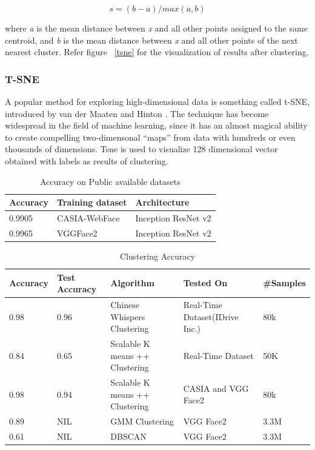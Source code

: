 \documentclass[a4paper,12pt, twoside]{NITKReport}
\begin{document}
\begin{equation}
s = (b-a)/max(a,b)
\end{equation}

\par where \textit{a} is the mean distance between \textit{x} and all other points
assigned to the same centroid, and \textit{b} is the mean distance between \textit{x} and all other points of the next nearest cluster. Refer figure ~\ref{tsne} for the visualization of results after clustering.

\subsubsection{T-SNE}
A popular method for exploring high-dimensional data is something called t-SNE, introduced by van der Maaten and Hinton \cite{maaten2008visualizing} . The technique has become widespread in the field of machine learning, since it has an almost magical ability to create compelling two-dimensonal “maps” from data with hundreds or even thousands of dimensions. Tsne is used to visualize 128 dimensional vector obtained with labels as results of clustering.

\begin{table}[h]
  \centering
\begin{tabular}{ |p{4cm}|p{4cm}|p{4cm}|}
\hline
Accuracy & Training dataset & Architecture\\
\hline
0.9905 & CASIA-WebFace & Inception ResNet v2 \\
\hline
0.9965 & VGGFace2 &	Inception ResNet v2 \\
\hline
\end{tabular}
\caption{Accuracy on Public available datasets}\label{table:acc_}
\end{table}


\begin{table}[h]
  \centering
\begin{tabular}{ |p{1.5cm}|p{1.5cm}|p{3.5cm}|p{4cm}|p{2cm}|}
\hline
Accuracy & Test Accuracy & Algorithm & Tested On & \#Samples\\
\hline
0.98 & 0.96 & Chinese Whispers Clustering & Real-Time Dataset(IDrive Inc.) & 80k \\
\hline
0.84 & 0.65 & Scalable K means ++ Clustering & Real-Time Dataset & 50K \\
\hline
0.98 & 0.94 & Scalable K means ++ Clustering & CASIA and VGG Face2 & 80k \\
\hline
0.89 & NIL & GMM Clustering & VGG Face2 & 3.3M \\
\hline
0.61 & NIL & DBSCAN & VGG Face2 & 3.3M \\
\hline
\end{tabular}
\caption{Clustering Accuracy}\label{table:cluster}
\end{table}
\end{document}
